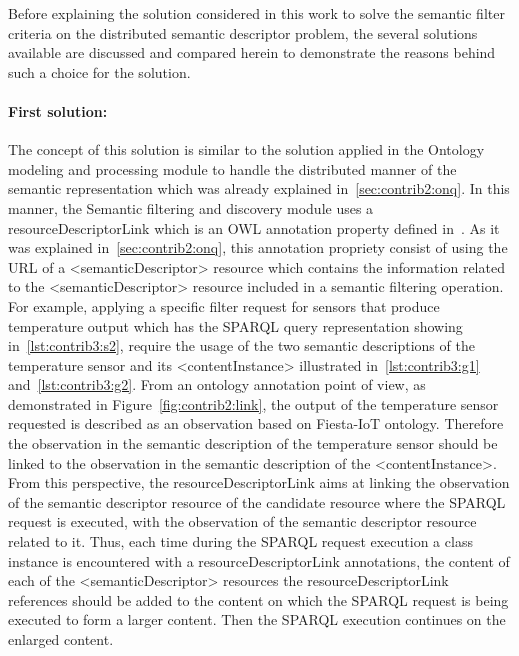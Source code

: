 Before explaining the solution considered in this work to solve the semantic filter criteria on the distributed semantic descriptor problem, the several solutions available are discussed and compared herein to demonstrate the reasons behind such a choice for the solution.
 
\paragraph{First solution: }
The concept of this solution is similar to the solution applied in the Ontology modeling and processing module to handle the distributed manner of the semantic representation which was already explained in~\ref{sec:contrib2:onq}. In this manner, the Semantic filtering and discovery module uses a resourceDescriptorLink which is an OWL annotation property defined in~\cite{211}. As it was explained in~\ref{sec:contrib2:onq}, this annotation propriety consist of using the URL of a <semanticDescriptor> resource which contains the information related to the <semanticDescriptor> resource included in a semantic filtering operation. For example, applying a specific filter request for sensors that produce temperature output which has the SPARQL query representation showing in~\ref{lst:contrib3:s2}, require the usage of the two semantic descriptions of the temperature sensor and its <contentInstance> illustrated in~\ref{lst:contrib3:g1} and~\ref{lst:contrib3:g2}. From an ontology annotation point of view, as demonstrated in Figure~\ref{fig:contrib2:link}, the output of the temperature sensor requested is described as an observation based on Fiesta-IoT ontology. Therefore the observation in the semantic description of the temperature sensor should be linked to the observation in the semantic description of the <contentInstance>. From this perspective, the resourceDescriptorLink aims at linking the observation of the semantic descriptor resource of the candidate resource where the SPARQL request is executed, with the observation of the semantic descriptor resource related to it. Thus, each time during the SPARQL request execution a class instance is encountered with a resourceDescriptorLink annotations, the content of each of the <semanticDescriptor> resources the resourceDescriptorLink references should be added to the content on which the SPARQL request is being executed to form a larger content. Then the SPARQL execution continues on the enlarged content. 

